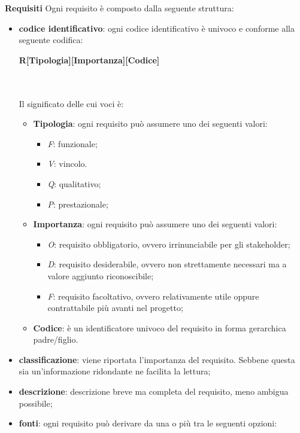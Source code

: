 			\noindent
			\textbf{Requisiti} \newline \newline
			Ogni requisito è composto dalla seguente struttura:
			\begin{itemize}
				\item \textbf{codice identificativo}: ogni codice identificativo è univoco e conforme alla seguente codifica: \\
				\centerline{\textbf{R[Tipologia][Importanza][Codice]}} \\ \\
				Il significato delle cui voci è:
				\begin{itemize}					
					\item \textbf{Tipologia}: ogni requisito può assumere uno dei seguenti valori:
					\begin{itemize}
						\item \textit{F}: funzionale;
						\item \textit{V}: vincolo.
						\item \textit{Q}: qualitativo;
						\item \textit{P}: prestazionale;		
					\end{itemize}
				\item \textbf{Importanza}: ogni requisito può assumere uno dei seguenti valori:
				\begin{itemize}
					\item \textit{O}: requisito obbligatorio, ovvero irrinunciabile per gli stakeholder;
					\item \textit{D}: requisito desiderabile, ovvero non strettamente necessari ma a valore aggiunto riconoscibile;
					\item \textit{F}: requisito facoltativo, ovvero relativamente utile oppure contrattabile più avanti nel progetto;	
				\end{itemize}
					\item \textbf{Codice}: è un identificatore univoco del requisito in forma gerarchica padre/figlio.
				\end{itemize}
				\item \textbf{classificazione}: viene riportata l'importanza del requisito. Sebbene questa sia un'informazione ridondante ne facilita la lettura;
				\item \textbf{descrizione}: descrizione breve ma completa del requisito, meno ambigua possibile;
				\item \textbf{fonti}: ogni requisito può derivare da una o più tra le seguenti opzioni:

\end{itemize}
